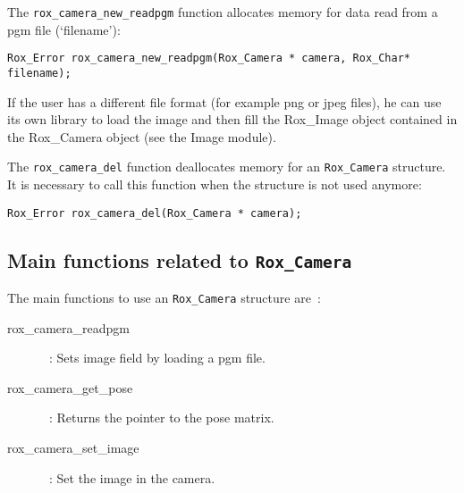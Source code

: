 

The \lstinline$rox_camera_new_readpgm$ function allocates memory for data read from a pgm file (`filename'):
\begin{lstlisting}
Rox_Error rox_camera_new_readpgm(Rox_Camera * camera, Rox_Char* filename);
\end{lstlisting}
If the user has a different file format (for example png or jpeg files), he can use its own library to load the image and then fill the Rox\_Image object contained in the Rox\_Camera object (see the Image module).

The \lstinline$rox_camera_del$ function deallocates memory for an \lstinline$Rox_Camera$ structure. It is necessary to call this function when the structure is not used anymore:
\begin{lstlisting}
Rox_Error rox_camera_del(Rox_Camera * camera);
\end{lstlisting}

\subsection{Main functions related to {\tt Rox\_Camera}}
\label{sse:camera_functs}

The main functions to use an \lstinline$Rox_Camera$ structure are~:
\begin{description}
  \item [rox\_camera\_readpgm]~: Sets image field by loading a pgm file.
  \item [rox\_camera\_get\_pose]~: Returns the pointer to the pose matrix.
  \item [rox\_camera\_set\_image]~: Set the image in the camera.
\end{description}
 


